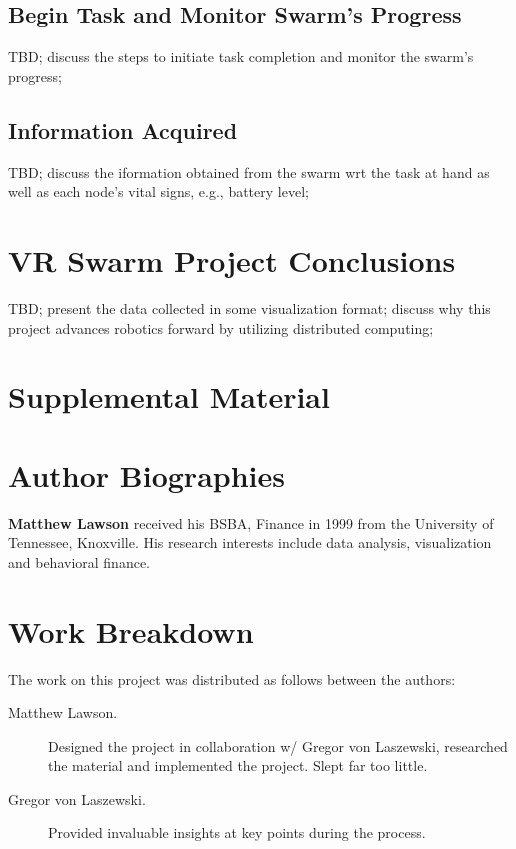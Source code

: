\documentclass[9pt,twocolumn,twoside]{../../styles/osajnl}
\begin{document}
\subsection{Begin Task and Monitor Swarm's Progress}
TBD; discuss the steps to initiate task completion and monitor the swarm's progress;
\subsection{Information Acquired}
TBD; discuss the iformation obtained from the swarm wrt the task at hand as well as each node's vital signs, e.g., battery level;

\section{VR Swarm Project Conclusions}
TBD; present the data collected in some visualization format; discuss why this project advances robotics forward by utilizing distributed computing;

\section{Supplemental Material}



 
\section*{Author Biographies}
\begingroup
\setlength\intextsep{0pt}
\begin{minipage}[t][3.2cm][t]{1.0\columnwidth} %
  \noindent
  {\bfseries Matthew Lawson} received his BSBA, Finance in 1999 from
  the University of Tennessee, Knoxville. His research interests include
  data analysis, visualization and behavioral finance.
\end{minipage}
\endgroup

\appendix

\section{Work Breakdown}

The work on this project was distributed as follows between the
authors:


\begin{description}

\item[Matthew Lawson.] Designed the project in collaboration w/ Gregor von Laszewski, researched the material and implemented the project.  Slept far too little.

\item[Gregor von Laszewski.] Provided invaluable insights at key points during the process.

\end{description}
\end{document}
